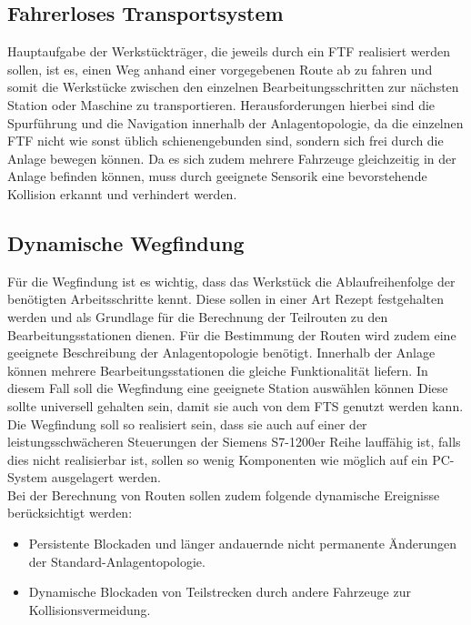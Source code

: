\subsection{Fahrerloses Transportsystem}
	Hauptaufgabe der Werkstückträger, die jeweils durch ein \ac{FTF} realisiert werden sollen, ist es, einen Weg anhand einer vorgegebenen Route ab zu fahren und somit die Werkstücke zwischen den einzelnen Bearbeitungsschritten zur nächsten Station oder Maschine zu transportieren. Herausforderungen hierbei sind die Spurführung und die Navigation innerhalb der Anlagentopologie, da die einzelnen \ac{FTF} nicht wie sonst üblich schienengebunden sind, sondern sich frei durch die Anlage bewegen können. Da es sich zudem mehrere Fahrzeuge gleichzeitig in der Anlage befinden können, muss durch geeignete Sensorik eine bevorstehende Kollision erkannt und verhindert werden.
\subsection{Dynamische Wegfindung}
	Für die Wegfindung ist es wichtig, dass das Werkstück die Ablaufreihenfolge der benötigten Arbeitsschritte kennt. Diese sollen in einer Art Rezept festgehalten werden und als Grundlage für die Berechnung der Teilrouten zu den Bearbeitungsstationen dienen. Für die Bestimmung der Routen wird zudem eine geeignete Beschreibung der Anlagentopologie benötigt. Innerhalb der Anlage können mehrere Bearbeitungsstationen die gleiche Funktionalität liefern. In diesem Fall soll die Wegfindung eine geeignete Station auswählen können Diese sollte universell gehalten sein, damit sie auch von dem \ac{FTS} genutzt werden kann. Die Wegfindung soll so realisiert sein, dass sie auch auf einer der leistungsschwächeren Steuerungen der Siemens S7-1200er Reihe lauffähig ist, falls dies nicht realisierbar ist, sollen so wenig Komponenten wie möglich auf ein PC-System ausgelagert werden.
	\\ Bei der Berechnung von Routen sollen zudem folgende dynamische Ereignisse berücksichtigt werden:
	\begin{itemize}
		\item Persistente Blockaden und länger andauernde  nicht permanente Änderungen der Standard-Anlagentopologie.
		\item Dynamische Blockaden von Teilstrecken durch andere Fahrzeuge zur Kollisionsvermeidung.
	\end{itemize}
	
	

